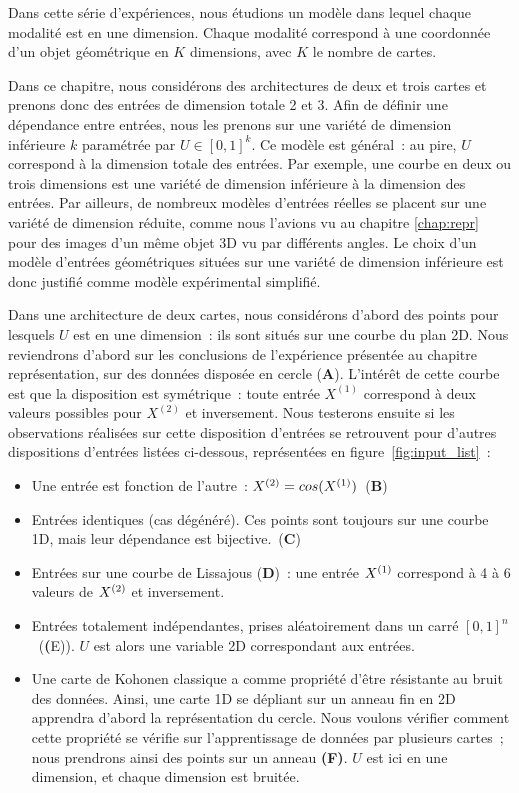 \documentclass[../main]{subfiles}
\begin{document}
Dans cette série d'expériences, nous étudions un modèle dans lequel chaque modalité est en une dimension. Chaque modalité correspond à une coordonnée d'un objet géométrique en $K$ dimensions, avec  $K$ le nombre de cartes. 

Dans ce chapitre, nous considérons des architectures de deux et trois cartes et prenons donc des entrées de dimension totale 2 et 3.
Afin de définir une dépendance entre entrées, nous les prenons sur une variété de dimension inférieure $k$ paramétrée par $U \in [0,1]^k$.
Ce modèle est général~: au pire, $U$ correspond à la dimension totale des entrées. Par exemple, une courbe en deux ou trois dimensions est une variété de dimension inférieure à la dimension des entrées.
Par ailleurs, de nombreux modèles d'entrées réelles se placent sur une variété de dimension réduite, comme nous l'avions vu au chapitre \ref{chap:repr} pour des images d'un même objet 3D vu par différents angles. Le choix d'un modèle d'entrées géométriques situées sur une variété de dimension inférieure est donc justifié comme modèle expérimental simplifié.


Dans une architecture de deux cartes, nous considérons d'abord des points pour lesquels $U$ est en une dimension~: ils sont situés sur une courbe du plan 2D.
Nous reviendrons d'abord  sur les conclusions de l'expérience présentée au chapitre représentation, sur des données disposée en cercle (\textbf{A}). L'intérêt de cette courbe est que la disposition est symétrique~: toute entrée $X^{(1)}$ correspond à deux valeurs possibles pour $X^{(2)}$ et inversement.
Nous testerons ensuite si les observations réalisées sur cette disposition d'entrées se retrouvent pour d'autres dispositions d'entrées listées ci-dessous, représentées en figure~\ref{fig:input_list}~:
\begin{itemize}
	\item Une entrée est fonction de l'autre~: $X^{({2})} = cos(X^{({1})})$~(\textbf{B})
	\item Entrées identiques (cas dégénéré). Ces points sont toujours sur une courbe 1D, mais leur dépendance est bijective.~(\textbf{C})
	\item Entrées sur une courbe de Lissajous (\textbf{D})~: une entrée $X^{({1})}$ correspond à 4 à 6 valeurs de $X^{({2})}$ et inversement.
	\item Entrées totalement indépendantes, prises aléatoirement dans un carré $[0,1]^n$~(\textbf({E})). $U$ est alors une variable 2D correspondant aux entrées.
	\item Une carte de Kohonen classique a comme propriété d'être résistante au bruit des données. Ainsi, une carte 1D se dépliant sur un anneau fin en 2D apprendra d'abord la représentation du cercle. Nous voulons vérifier comment cette propriété se vérifie sur l'apprentissage de données par plusieurs cartes~; nous prendrons ainsi des points sur un anneau \textbf{(F)}. $U$ est ici en une dimension, et chaque dimension est bruitée.
\end{itemize}
\end{document}
